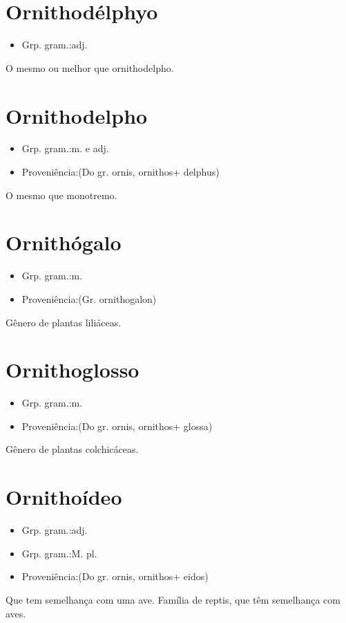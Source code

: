 \section{Ornithodélphyo}
\begin{itemize}
\item {Grp. gram.:adj.}
\end{itemize}
O mesmo ou melhor que \textunderscore ornithodelpho\textunderscore .
\section{Ornithodelpho}
\begin{itemize}
\item {Grp. gram.:m.  e  adj.}
\end{itemize}
\begin{itemize}
\item {Proveniência:(Do gr. \textunderscore ornis\textunderscore , \textunderscore ornithos\textunderscore  + \textunderscore delphus\textunderscore )}
\end{itemize}
O mesmo que \textunderscore monotremo\textunderscore .
\section{Ornithógalo}
\begin{itemize}
\item {Grp. gram.:m.}
\end{itemize}
\begin{itemize}
\item {Proveniência:(Gr. \textunderscore ornithogalon\textunderscore )}
\end{itemize}
Gênero de plantas liliáceas.
\section{Ornithoglosso}
\begin{itemize}
\item {Grp. gram.:m.}
\end{itemize}
\begin{itemize}
\item {Proveniência:(Do gr. \textunderscore ornis\textunderscore , \textunderscore ornithos\textunderscore  + \textunderscore glossa\textunderscore )}
\end{itemize}
Gênero de plantas colchicáceas.
\section{Ornithoídeo}
\begin{itemize}
\item {Grp. gram.:adj.}
\end{itemize}
\begin{itemize}
\item {Grp. gram.:M. pl.}
\end{itemize}
\begin{itemize}
\item {Proveniência:(Do gr. \textunderscore ornis\textunderscore , \textunderscore ornithos\textunderscore  + \textunderscore eidos\textunderscore )}
\end{itemize}
Que tem semelhança com uma ave.
Família de reptis, que têm semelhança com aves.
